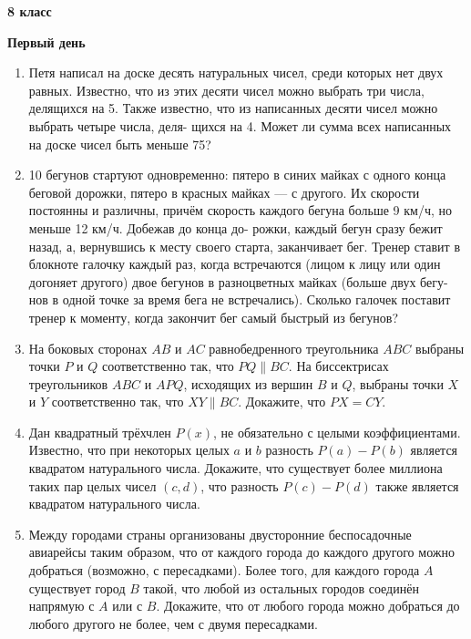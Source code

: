 \documentclass{article}
\begin{document}
\large
	
\begin{center}
	\LARGE\textbf{8 класс}
\end{center}
\begin{center}
	\large\textbf{Первый день}
\end{center}


\begin{enumerate}[label*=8.{\arabic{enumi}}]
\setcounter{enumi}{0}
\item Петя написал на доске десять натуральных чисел, среди которых нет двух равных. Известно, что из этих десяти чисел можно выбрать три числа, делящихся на 5. Также известно, что из написанных десяти чисел можно выбрать четыре числа, деля- щихся на 4. Может ли сумма всех написанных на доске чисел быть меньше 75?

\item 10 бегунов стартуют одновременно: пятеро в синих майках с одного конца беговой дорожки, пятеро в красных майках — с другого. Их скорости постоянны и различны, причём скорость каждого бегуна больше 9 км/ч, но меньше 12 км/ч. Добежав до конца до- рожки, каждый бегун сразу бежит назад, а, вернувшись к месту своего старта, заканчивает бег. Тренер ставит в блокноте галочку каждый раз, когда встречаются (лицом к лицу или один догоняет другого) двое бегунов в разноцветных майках (больше двух бегу- нов в одной точке за время бега не встречались). Сколько галочек поставит тренер к моменту, когда закончит бег самый быстрый из бегунов?

\item На боковых сторонах $AB$ и $AC$ равнобедренного треугольника $ABC$ выбраны точки $P$ и $Q$ соответственно так, что $PQ \parallel BC$. На биссектрисах треугольников $ABC$ и $APQ$, исходящих из вершин $B$ и $Q$, выбраны точки $X$ и $Y$ соответственно так, что $XY \parallel BC$. Докажите, что $PX = CY$.

\item Дан квадратный трёхчлен $P(x)$, не обязательно с целыми коэффициентами. Известно, что при некоторых целых $a$ и $b$ разность $P(a) - P(b)$ является квадратом натурального числа. Докажите, что существует более миллиона таких пар целых чисел $(c, d)$, что разность $P(c) - P(d)$ также является квадратом натурального числа.

\item Между городами страны организованы двусторонние беспосадочные авиарейсы таким образом, что от каждого города до каждого другого можно добраться (возможно, с пересадками). Более того, для каждого города $A$ существует город $B$ такой, что любой из остальных городов соединён напрямую с $A$ или с $B$. Докажите, что от любого города можно добраться до любого другого не более, чем с двумя пересадками.

\end{enumerate}
\end{document}
